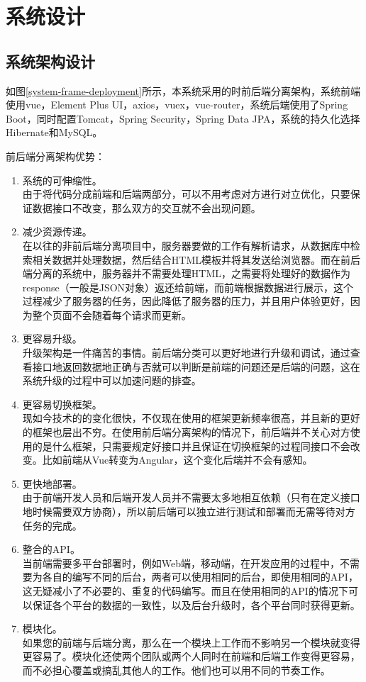 
\chapter{系统设计}

\label{系统设计}


\section{系统架构设计}

如图\ref{system-frame-deployment}所示，本系统采用的时前后端分离架构，系统前端使用vue，Element Plus UI，axios，vuex，vue-router，系统后端使用了Spring Boot，同时配置Tomcat，Spring Security，Spring Data JPA，系统的持久化选择Hibernate和MySQL。

前后端分离架构优势：
\begin{enumerate}
    \item 系统的可伸缩性。\\由于将代码分成前端和后端两部分，可以不用考虑对方进行对立优化，只要保证数据接口不改变，那么双方的交互就不会出现问题。
    \item 减少资源传递。\\在以往的非前后端分离项目中，服务器要做的工作有解析请求，从数据库中检索相关数据并处理数据，然后结合HTML模板并将其发送给浏览器。而在前后端分离的系统中，服务器并不需要处理HTML，之需要将处理好的数据作为response（一般是JSON对象）返还给前端，而前端根据数据进行展示，这个过程减少了服务器的任务，因此降低了服务器的压力，并且用户体验更好，因为整个页面不会随着每个请求而更新。
    \item 更容易升级。\\升级架构是一件痛苦的事情。前后端分类可以更好地进行升级和调试，通过查看接口地返回数据地正确与否就可以判断是前端的问题还是后端的问题，这在系统升级的过程中可以加速问题的排查。
    \item 更容易切换框架。\\现如今技术的的变化很快，不仅现在使用的框架更新频率很高，并且新的更好的框架也层出不穷。在使用前后端分离架构的情况下，前后端并不关心对方使用的是什么框架，只需要规定好接口并且保证在切换框架的过程同接口不会改变。比如前端从Vue转变为Angular，这个变化后端并不会有感知。
    \item 更快地部署。\\由于前端开发人员和后端开发人员并不需要太多地相互依赖（只有在定义接口地时候需要双方协商），所以前后端可以独立进行测试和部署而无需等待对方任务的完成。
    \item 整合的API。\\当前端需要多平台部署时，例如Web端，移动端，在开发应用的过程中，不需要为各自的编写不同的后台，两者可以使用相同的后台，即使用相同的API，这无疑减小了不必要的、重复的代码编写。而且在使用相同的API的情况下可以保证各个平台的数据的一致性，以及后台升级时，各个平台同时获得更新。
    \item 模块化。\\如果您的前端与后端分离，那么在一个模块上工作而不影响另一个模块就变得更容易了。模块化还使两个团队或两个人同时在前端和后端工作变得更容易，而不必担心覆盖或搞乱其他人的工作。他们也可以用不同的节奏工作。
\end{enumerate}

